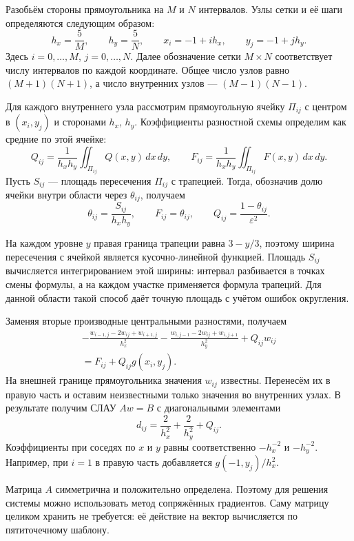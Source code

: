 \documentclass[a4paper,12pt]{extarticle}
\begin{document}
Разобьём стороны прямоугольника на $M$ и $N$ интервалов. Узлы сетки и её шаги определяются следующим образом:
\[
    h_x=\frac{5}{M},\qquad h_y=\frac{5}{N},\qquad
    x_i=-1+ih_x,\qquad y_j=-1+jh_y.
\]
Здесь $i=0,\ldots,M$, $j=0,\ldots,N$. Далее обозначение сетки $M\times N$ соответствует числу интервалов по каждой координате. Общее число узлов равно $(M+1)(N+1)$, а число внутренних узлов --- $(M-1)(N-1)$.

Для каждого внутреннего узла рассмотрим прямоугольную ячейку $\Pi_{ij}$ с центром в $(x_i,y_j)$ и сторонами $h_x$, $h_y$. Коэффициенты разностной схемы определим как средние по этой ячейке:
\[
    Q_{ij}=\frac{1}{h_xh_y}\iint_{\Pi_{ij}}Q(x,y)\,dx\,dy,
    \qquad
    F_{ij}=\frac{1}{h_xh_y}\iint_{\Pi_{ij}}F(x,y)\,dx\,dy.
\]
Пусть $S_{ij}$ --- площадь пересечения $\Pi_{ij}$ с трапецией. Тогда, обозначив долю ячейки внутри области через $\theta_{ij}$, получаем
\begin{equation}
    \theta_{ij}=\frac{S_{ij}}{h_xh_y},\qquad
    F_{ij}=\theta_{ij},\qquad
    Q_{ij}=\frac{1-\theta_{ij}}{\varepsilon^2}.
    \label{eq:coefficients}
\end{equation}

На каждом уровне $y$ правая граница трапеции равна $3-y/3$, поэтому ширина пересечения с ячейкой является кусочно-линейной функцией. Площадь $S_{ij}$ вычисляется интегрированием этой ширины: интервал разбивается в точках смены формулы, а на каждом участке применяется формула трапеций. Для данной области такой способ даёт точную площадь с учётом ошибок округления.

Заменяя вторые производные центральными разностями, получаем
\begin{equation}
\begin{split}
    -\frac{w_{i-1,j}-2w_{ij}+w_{i+1,j}}{h_x^2}
    -\frac{w_{i,j-1}-2w_{ij}+w_{i,j+1}}{h_y^2}
    +Q_{ij}w_{ij}\\
    =F_{ij}+Q_{ij}g(x_i,y_j).
\end{split}
    \label{eq:scheme}
\end{equation}
На внешней границе прямоугольника значения $w_{ij}$ известны. Перенесём их в правую часть и оставим неизвестными только значения во внутренних узлах. В результате получим СЛАУ $Aw=B$ с диагональными элементами
\[
    d_{ij}=\frac{2}{h_x^2}+\frac{2}{h_y^2}+Q_{ij}.
\]
Коэффициенты при соседях по $x$ и $y$ равны соответственно $-h_x^{-2}$ и $-h_y^{-2}$. Например, при $i=1$ в правую часть добавляется $g(-1,y_j)/h_x^2$.

Матрица $A$ симметрична и положительно определена. Поэтому для решения системы можно использовать метод сопряжённых градиентов. Саму матрицу целиком хранить не требуется: её действие на вектор вычисляется по пятиточечному шаблону.
\end{document}
